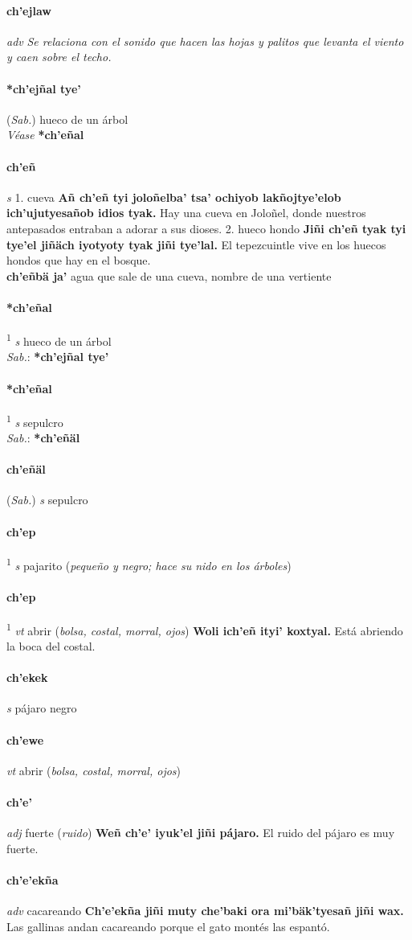 \documentclass{scrbook}
\newcommand{\entry}[1]{\paragraph{#1}}
\newcommand{\onedefinition}[1]{#1.}
\newcommand{\defsuperscript}[1]{\textsuperscript{1}}
\newcommand{\nontranslationdef}[1]{\textit{#1}}
\newcommand{\partofspeech}[1]{\textit{#1}}
\newcommand{\spanishtranslation}[1]{#1}
\newcommand{\clarification}[1]{(\textit{#1})}
\newcommand{\cholexample}[1]{\textbf{#1}}
\newcommand{\exampletranslation}[1]{#1}
\newcommand{\dialectvariant}[1]{\\\textit{#1}:}
\newcommand{\dialectword}[1]{\textbf{#1}}
\newcommand{\alsosee}[1]{\\\textit{Véase} \textbf{#1}}
\newcommand{\relevantdialect}[1]{(\textit{#1})}
\newcommand{\secondaryentry}[1]{\\\textbf{#1}}
\newcommand{\secondtranslation}[1]{#1}
\begin{document}
\begin{multicols}{2}
\entry{ch'ejlaw}
\partofspeech{adv}
\nontranslationdef{Se relaciona con el sonido que hacen las hojas y palitos que levanta el viento y caen sobre el techo.}

\entry{*ch'ejñal tye'}
\relevantdialect{Sab.}
\spanishtranslation{hueco de un árbol}
\alsosee{*ch'eñal}

\entry{ch'eñ}
\partofspeech{s}
\onedefinition{1}
\spanishtranslation{cueva}
\cholexample{Añ ch'eñ tyi joloñelba' tsa' ochiyob lakñojtye'elob ich'ujutyesañob idios tyak.}
\exampletranslation{Hay una cueva en Joloñel, donde nuestros antepasados entraban a adorar a sus dioses.}
\onedefinition{2}
\spanishtranslation{hueco hondo}
\cholexample{Jiñi ch'eñ tyak tyi tye'el jiñäch iyotyoty tyak jiñi tye'lal.}
\exampletranslation{El tepezcuintle vive en los huecos hondos que hay en el bosque.}
\secondaryentry{ch'eñbä ja'}
\secondtranslation{agua que sale de una cueva, nombre de una vertiente}

\entry{*ch'eñal}
\defsuperscript{1}
\partofspeech{s}
\spanishtranslation{hueco de un árbol}
\dialectvariant{Sab.}
\dialectword{*ch'ejñal tye'}

\entry{*ch'eñal}
\defsuperscript{2}
\partofspeech{s}
\spanishtranslation{sepulcro}
\dialectvariant{Sab.}
\dialectword{*ch'eñäl}

\entry{ch'eñäl}
\relevantdialect{Sab.}
\partofspeech{s}
\spanishtranslation{sepulcro}

\entry{ch'ep}
\defsuperscript{1}
\partofspeech{s}
\spanishtranslation{pajarito}
\clarification{pequeño y negro; hace su nido en los árboles}

\entry{ch'ep}
\defsuperscript{2}
\partofspeech{vt}
\spanishtranslation{abrir}
\clarification{bolsa, costal, morral, ojos}
\cholexample{Woli ich'eñ ityi' koxtyal.}
\exampletranslation{Está abriendo la boca del costal.}

\entry{ch'ekek}
\partofspeech{s}
\spanishtranslation{pájaro negro}

\entry{ch'ewe}
\partofspeech{vt}
\spanishtranslation{abrir}
\clarification{bolsa, costal, morral, ojos}

\entry{ch'e'}
\partofspeech{adj}
\spanishtranslation{fuerte}
\clarification{ruido}
\cholexample{Weñ ch'e' iyuk'el jiñi pájaro.}
\exampletranslation{El ruido del pájaro es muy fuerte.}

\entry{ch'e'ekña}
\partofspeech{adv}
\spanishtranslation{cacareando}
\cholexample{Ch'e'ekña jiñi muty che'baki ora mi'bäk'tyesañ jiñi wax.}
\exampletranslation{Las gallinas andan cacareando porque el gato montés las espantó.}


\end{multicols}
\end{document}
